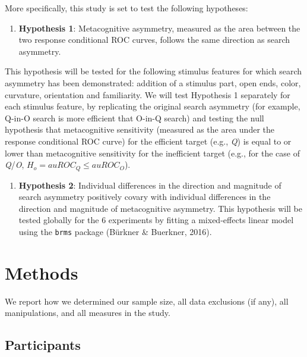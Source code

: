 \documentclass[
  english,
  man,floatsintext]{apa6}
\providecommand{\tightlist}{%
  \setlength{\itemsep}{0pt}\setlength{\parskip}{0pt}}
\begin{document}
More specifically, this study is set to test the following hypotheses:

\begin{enumerate}
\def\labelenumi{\arabic{enumi}.}
\tightlist
\item
  \textbf{Hypothesis 1}: Metacognitive asymmetry, measured as the area between the two response conditional ROC curves, follows the same direction as search asymmetry.
\end{enumerate}

This hypothesis will be tested for the following stimulus features for which search asymmetry has been demonstrated: addition of a stimulus part, open ends, color, curvature, orientation and familiarity. We will test Hypothesis 1 separately for each stimulus feature, by replicating the original search asymmetry (for example, Q-in-O search is more efficient that O-in-Q search) and testing the null hypothesis that metacognitive sensitivity (measured as the area under the response conditional ROC curve) for the efficient target (e.g., \emph{Q}) is equal to or lower than metacognitive sensitivity for the inefficient target (e.g., for the case of \emph{Q}/\emph{O}, \(H_o=auROC_{Q}\leq auROC_O\)).

\begin{enumerate}
\def\labelenumi{\arabic{enumi}.}
\setcounter{enumi}{1}
\tightlist
\item
  \textbf{Hypothesis 2}: Individual differences in the direction and magnitude of search asymmetry positively covary with individual differences in the direction and magnitude of metacognitive asymmetry. This hypothesis will be tested globally for the 6 experiments by fitting a mixed-effects linear model using the \texttt{brms} package (Bürkner \& Buerkner, 2016).
\end{enumerate}

\hypertarget{methods}{%
\section{Methods}\label{methods}}

We report how we determined our sample size, all data exclusions (if any), all manipulations, and all measures in the study.

\hypertarget{participants}{%
\subsection{Participants}\label{participants}}
\end{document}
